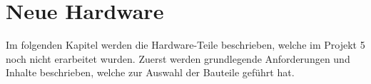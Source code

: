 \newpage

\section{Neue Hardware}
\label{sec:Neue Hardware}

Im folgenden Kapitel werden die Hardware-Teile beschrieben, welche im Projekt 5 noch nicht erarbeitet wurden. Zuerst werden grundlegende Anforderungen und Inhalte beschrieben, welche zur Auswahl der Bauteile geführt hat.